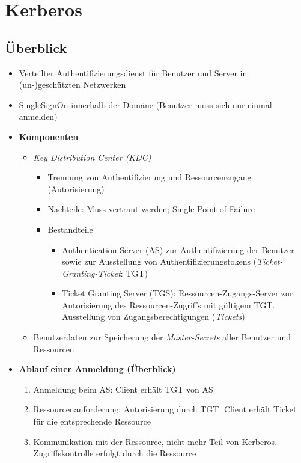 \section{Kerberos}

\subsection{Überblick}
\begin{itemize}
	\item Verteilter Authentifizierungsdienst für Benutzer und Server in (un-)geschützten Netzwerken
	\item SingleSignOn innerhalb der Domäne (Benutzer muss sich nur einmal anmelden)
	\item \textbf{Komponenten}
	\begin{itemize}
		\item \textit{Key Distribution Center (KDC)}
		\begin{itemize}
			\item Trennung von Authentifizierung und Ressourcenzugang (Autorisierung)
			\item Nachteile: Muss vertraut werden; Single-Point-of-Failure
			\item Bestandteile
			\begin{itemize}
				\item Authentication Server (AS) zur Authentifizierung der Benutzer sowie zur Ausstellung von Authentifizierungstokens (\textit{Ticket-Granting-Ticket}: TGT)
				\item Ticket Granting Server (TGS): Ressourcen-Zugangs-Server zur Autorisierung des Ressourcen-Zugriffs mit gültigem TGT. Ausstellung von Zugangsberechtigungen (\textit{Tickets})
			\end{itemize}
		\end{itemize}
		\item Benutzerdaten zur Speicherung der \textit{Master-Secrets} aller Benutzer und Ressourcen
	\end{itemize}
	\item \textbf{Ablauf einer Anmeldung (Überblick)}
	\begin{enumerate}
		\item Anmeldung beim AS: Client erhält TGT von AS
		\item Ressourcenanforderung: Autorisierung durch TGT. Client erhält Ticket für die entsprechende Ressource
		\item Kommunikation mit der Ressource, nicht mehr Teil von Kerberos. Zugriffskontrolle erfolgt durch die Ressource

\end{enumerate}
\end{itemize}
